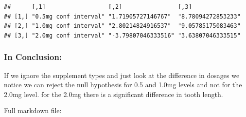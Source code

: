 \documentclass[]{article}
\newenvironment{Shaded}{\begin{snugshade}}{\end{snugshade}}
\newcommand{\KeywordTok}[1]{\textcolor[rgb]{0.13,0.29,0.53}{\textbf{{#1}}}}
\newcommand{\DataTypeTok}[1]{\textcolor[rgb]{0.13,0.29,0.53}{{#1}}}
\newcommand{\FloatTok}[1]{\textcolor[rgb]{0.00,0.00,0.81}{{#1}}}
\newcommand{\StringTok}[1]{\textcolor[rgb]{0.31,0.60,0.02}{{#1}}}
\newcommand{\NormalTok}[1]{{#1}}
\begin{document}
\begin{Shaded}
\end{Shaded}

\begin{verbatim}
##      [,1]                  [,2]                [,3]              
## [1,] "0.5mg conf interval" "1.71905727146767"  "8.78094272853233"
## [2,] "1.0mg conf interval" "2.80214824916537"  "9.05785175083463"
## [3,] "2.0mg conf interval" "-3.79807046333516" "3.63807046333515"
\end{verbatim}

\subsubsection{In Conclusion:}\label{in-conclusion}

If we ignore the supplement types and just look at the difference in
dosages we notice we can reject the null hypothesis for 0.5 and 1.0mg
levels and not for the 2.0mg level. for the 2.0mg there is a significant
difference in tooth length.

Full markdown file:
\end{document}
